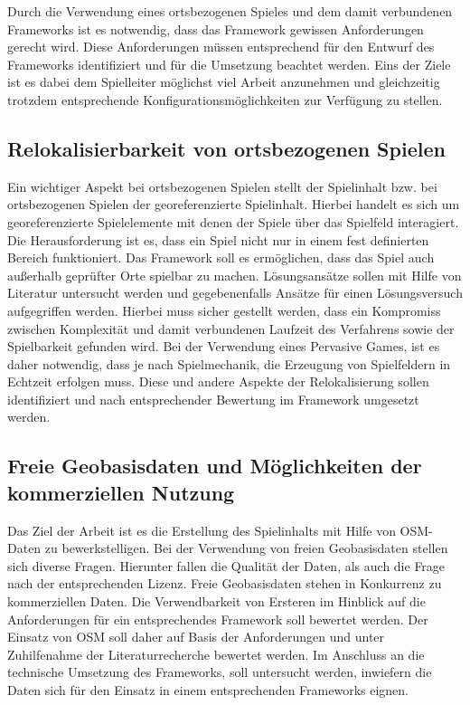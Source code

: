 Durch die Verwendung eines ortsbezogenen Spieles und dem damit verbundenen Frameworks ist es notwendig, dass das Framework gewissen Anforderungen gerecht wird. Diese Anforderungen müssen entsprechend für den Entwurf des Frameworks identifiziert und für die Umsetzung beachtet werden. Eins der Ziele ist es dabei dem Spielleiter möglichst viel Arbeit anzunehmen und gleichzeitig trotzdem entsprechende Konfigurationsmöglichkeiten zur Verfügung zu stellen.

\subsection*{Relokalisierbarkeit von ortsbezogenen Spielen}

Ein wichtiger Aspekt bei ortsbezogenen Spielen stellt der Spielinhalt bzw. bei ortsbezogenen Spielen der georeferenzierte Spielinhalt. Hierbei handelt es sich um georeferenzierte Spielelemente mit denen der Spiele über das Spielfeld interagiert. Die Herausforderung ist es, dass ein Spiel nicht nur in einem fest definierten Bereich funktioniert. Das Framework soll es ermöglichen, dass das Spiel auch außerhalb geprüfter Orte spielbar zu machen. Lösungsansätze sollen mit Hilfe von Literatur untersucht werden und gegebenenfalls Ansätze für einen Lösungsversuch aufgegriffen werden. Hierbei muss sicher gestellt werden, dass ein Kompromiss zwischen Komplexität und damit verbundenen Laufzeit des Verfahrens sowie der Spielbarkeit gefunden wird. Bei der Verwendung eines Pervasive Games, ist es daher notwendig, dass je nach Spielmechanik, die Erzeugung von Spielfeldern in Echtzeit erfolgen muss. Diese und andere Aspekte der Relokalisierung sollen identifiziert und nach entsprechender Bewertung im Framework umgesetzt werden.

\subsection*{Freie Geobasisdaten und Möglichkeiten der kommerziellen Nutzung}

Das Ziel der Arbeit ist es die Erstellung des Spielinhalts mit Hilfe von OSM-Daten zu bewerkstelligen.
Bei der Verwendung von freien Geobasisdaten stellen sich diverse Fragen. Hierunter fallen die Qualität der Daten, als auch die Frage nach der entsprechenden Lizenz. Freie Geobasisdaten stehen in Konkurrenz zu kommerziellen Daten. Die Verwendbarkeit von Ersteren im Hinblick auf die Anforderungen für ein entsprechendes Framework soll bewertet werden.
Der Einsatz von OSM soll daher auf Basis der Anforderungen und unter Zuhilfenahme der Literaturrecherche bewertet werden. Im Anschluss an die technische Umsetzung des Frameworks, soll untersucht werden, inwiefern die Daten sich für den Einsatz in einem entsprechenden Frameworks eignen.
